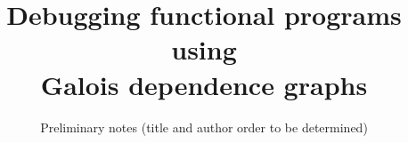 \documentclass[preprint,draft,acmsmall,screen]{acmart}
\begin{document}
\title[Debugging functional programs using Galois dependence graphs]{Debugging functional programs using \\Galois dependence graphs}
\subtitle{Preliminary notes (title and author order to be determined)}

\maketitle




\clearpage
\pagebreak

\clearpage
\pagebreak
\appendix





\end{document}

